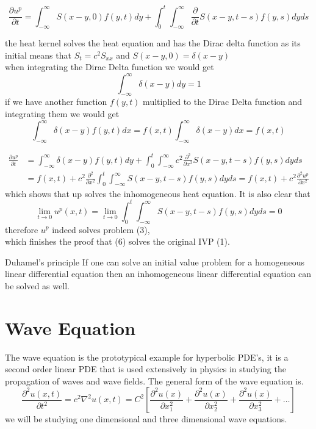 \documentclass[]{article}
\begin{document}
\[
    \frac{\partial u^p}{\partial t} = \int_{-\infty}^{\infty}S(x-y,0) f(y,t) dy  + \int_{0}^{t}\int_{-\infty}^{\infty}\frac{\partial}{\partial t}S(x-y,t-s) f(y,s)dyds    
\]
\begin{enrichment*}{}
    the heat kernel solves the heat equation and has the Dirac delta function as its initial
    means that $S_t =c^2 S_{xx}$ and $S(x-y,0) = \delta(x-y)$
    \\
    when integrating the Dirac Delta function we would get
    \[
        \int_{-\infty}^{\infty}\delta(x-y) dy = 1
    \]
    if we have another function $f(y,t)$ multiplied to the Dirac Delta function and integrating them we would get
    \[
        \int_{-\infty}^{\infty}\delta(x-y) f(y,t) dx = f(x,t)\int_{-\infty}^{\infty}\delta(x-y) dx = f(x,t) 
    \]
\end{enrichment*}
\begin{align*}
    \frac{\partial u^p}{\partial t} &= \int_{-\infty}^{\infty}\delta(x-y) f(y,t) dy  + \int_{0}^{t}\int_{-\infty}^{\infty}c^2 \frac{\partial^2}{\partial x^2}S(x-y,t-s) f(y,s)dyds
    \\
    &= f(x,t) + c^2 \frac{\partial^2}{\partial x^2} \int_{0}^{t}\int_{-\infty}^{\infty}S(x-y,t-s) f(y,s)dyds
    = f(x,t) + c^2 \frac{\partial^2 u^p}{\partial x^2}
\end{align*}
which shows that up solves the inhomogeneous heat equation. It is also clear that
\[
\lim_{t \to 0} u^p(x,t)  = \lim_{t \to 0}\int_{0}^{t} \int_{-\infty}^{\infty}S(x-y,t-s) f(y,s)dyds = 0
\]
therefore $u^p$ indeed solves problem (3), 
\\
which finishes the proof that (6) solves the original IVP (1).
\begin{enrichment*}{Duhamel's principle}
    If one can solve an initial value problem for a homogeneous linear differential equation then an inhomogeneous linear differential equation can be solved as well.
\end{enrichment*}

\newpage
\setcounter{equation}{0}
\section{Wave Equation}
The wave equation is the prototypical example for hyperbolic PDE's, it is a second order linear PDE that is used extensively in physics in studying the propagation of waves and wave fields. The general form of the wave equation is.
\[
\frac{\partial^2 u(x,t)}{\partial t^2} = c^2\nabla^2 u(x,t) = C^2\left[\frac{\partial^2 u(x)}{\partial x^{2}_{1}} + \frac{\partial^2 u(x)}{\partial x^{2}_{2}} + \frac{\partial^2 u(x)}{\partial x^{2}_{3}} + \dots\right]    
\]
we will be studying one dimensional and three dimensional wave equations.
\setcounter{equation}{0}
\end{document}
